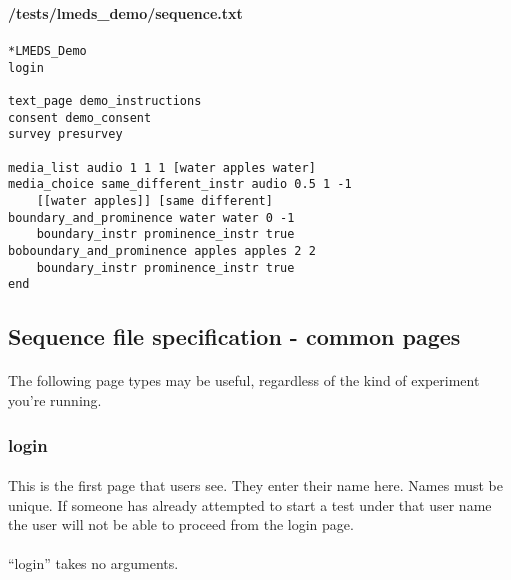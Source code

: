 \textbf{/tests/lmeds\_demo/sequence.txt}

\paragraph{}

\begin{tcolorbox}[colback=white,colframe=blue,width=\dimexpr\textwidth+12mm\relax,enlarge left by=-6mm,enlarge right by=6mm]

\begin{lstlisting}
*LMEDS_Demo
login

text_page demo_instructions
consent demo_consent
survey presurvey

media_list audio 1 1 1 [water apples water]
media_choice same_different_instr audio 0.5 1 -1
	[[water apples]] [same different]
boundary_and_prominence water water 0 -1
	boundary_instr prominence_instr true
boboundary_and_prominence apples apples 2 2 
	boundary_instr prominence_instr true
end
\end{lstlisting}
\end{tcolorbox}

\subsection{Sequence file specification - common pages}
\label{sec:sequenceSpecBasic}

\paragraph{}
The following page types may be useful, regardless of the kind of experiment you're running.

\subsubsection{login}

\paragraph{}
This is the first page that users see.  They enter their name here.  Names must be unique.  If someone has already attempted to start a test under that user name the user will not be able to proceed from the login page.

\paragraph{}
``login'' takes no arguments.

